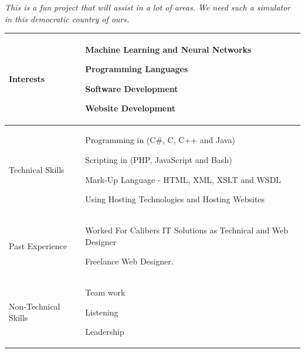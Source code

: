 \documentclass{article}
\begin{document}
 	\textit{This is a fun project that will assist in a lot of areas. We need such a simulator in this democratic country of ours.}

\begin{center}
\begin{tabularx}{1.0\textwidth}{|p{3cm}|X|}
\hline
 {\LARGE Interests} & 
 \begin{compactitem}
     \item {\large Machine Learning and Neural Networks}
     \item {\large Programming Languages}
     \item {\large Software Development}
     \item {\large Website Development}
 \end{compactitem} \\ 
 \hline
 {\LARGE Technical Skills} & 
 \begin{compactitem}
     \item {\large Programming in (C#, C, C++ and Java)} 
     \item {\large Scripting in (PHP, JavaScript and Bash)}
     \item {\large Mark-Up Language - HTML, XML, XSLT and WSDL}
     \item {\large Using Hosting Technologies and Hosting Websites}
 \end{compactitem} \\ 
 \hline
 {\LARGE Past Experience} & 
 \begin{compactitem}
     \item {\large Worked For Calibers IT Solutions as Technical and Web Designer}
     \item {\large Freelance Web Designer.}
 \end{compactitem} \\ 
 \hline
 {\LARGE Non-Technical Skills} & 
 \begin{compactitem}
     \item {\large Team work}
     \item {\large Listening}
     \item {\large Leadership}
 \end{compactitem} \\
 \hline 
\end{tabularx}
\end{center}
\pagebreak
\end{document}
